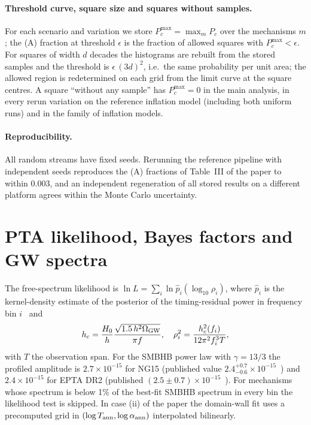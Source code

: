 \documentclass[aps,prd,onecolumn,superscriptaddress,nofootinbib,floatfix]{revtex4-2}
\begin{document}
\paragraph*{Threshold curve, square size and squares without samples.}
For each scenario and variation we store $P_c^{\max}=\max_m P_c$ over the mechanisms $m$; the (A) fraction at threshold $\epsilon$ is the fraction of allowed squares with $P_c^{\max}<\epsilon$. For squares of width $d$ decades the histograms are rebuilt from the stored samples and the threshold is $\epsilon\,(3d)^2$, i.e.\ the same probability per unit area; the allowed region is redetermined on each grid from the limit curve at the square centres. A square ``without any sample'' has $P_c^{\max}=0$ in the main analysis, in every rerun variation on the reference inflation model (including both uniform runs) and in the family of inflation models.

\paragraph*{Reproducibility.}
All random streams have fixed seeds. Rerunning the reference pipeline with independent seeds reproduces the (A) fractions of Table~III of the paper to within $0.003$, and an independent regeneration of all stored results on a different platform agrees within the Monte Carlo uncertainty.

\section{PTA likelihood, Bayes factors and GW spectra}\label{sec:pta}

The free-spectrum likelihood is $\ln L=\sum_i\ln\hat p_i(\log_{10}\rho_i)$, where $\hat p_i$ is the kernel-density estimate of the posterior of the timing-residual power in frequency bin $i$~\cite{Lamb:2023jls} and
\begin{equation}
h_c=\frac{H_0}{h}\frac{\sqrt{1.5\,h^2\Omega_{\rm GW}}}{\pi f},\quad
\rho_i^2=\frac{h_c^2(f_i)}{12\pi^2f_i^3T},
\end{equation}
with $T$ the observation span. For the SMBHB power law with $\gamma=13/3$ the profiled amplitude is $2.7\times10^{-15}$ for NG15 (published value $2.4^{+0.7}_{-0.6}\times10^{-15}$~\cite{NANOGrav:2023gor}) and $2.4\times10^{-15}$ for EPTA DR2 (published $(2.5\pm0.7)\times10^{-15}$~\cite{EPTA:2023fyk}). For mechanisms whose spectrum is below 1\% of the best-fit SMBHB spectrum in every bin the likelihood test is skipped. In case (ii) of the paper the domain-wall fit uses a precomputed grid in $(\log T_{\rm ann},\log\alpha_{\rm ann})$ interpolated bilinearly.
\end{document}
